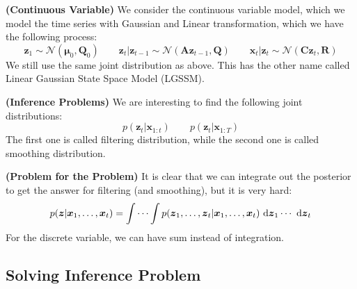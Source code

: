\begin{definition}{\textbf{(Continuous Variable)}}
    We consider the continuous variable model, which we model the time series with Gaussian and Linear transformation, which we have the following process:
    \begin{equation*}
        \boldsymbol z_1 \sim \mathcal{N}(\boldsymbol \mu_0, \boldsymbol Q_0) \qquad \boldsymbol z_t | \boldsymbol z_{t-1} \sim \mathcal{N}(\boldsymbol A\boldsymbol z_{t-1}, \boldsymbol Q) \qquad \boldsymbol x_t | \boldsymbol z_t \sim \mathcal{N}(\boldsymbol C\boldsymbol z_t, \boldsymbol R)
    \end{equation*}
    We still use the same joint distribution as above. This has the other name called Linear Gaussian State Space Model (LGSSM). 
\end{definition}

\begin{definition}{\textbf{(Inference Problems)}}
    We are interesting to find the following joint distributions:
    \begin{equation*}
        p(\boldsymbol z_t | \boldsymbol x_{1:t})  \qquad p(\boldsymbol z_t | \boldsymbol x_{1:T})
    \end{equation*}
    The first one is called filtering distribution, while the second one is called smoothing distribution. 
\end{definition}

\begin{remark}{\textbf{(Problem for the Problem)}}
    It is clear that we can integrate out the posterior to get the answer for filtering (and smoothing), but it is very hard:
    \begin{equation*}
        p(\boldsymbol z | \boldsymbol x_1,\dots,\boldsymbol x_t) = \int \cdots \int p(\boldsymbol z_1,\dots,\boldsymbol z_t|\boldsymbol x_1,\dots,\boldsymbol x_t) \ \mathrm{d} \boldsymbol z_1\cdots\ \mathrm{d} \boldsymbol z_t
    \end{equation*}
    For the discrete variable, we can have sum instead of integration.
\end{remark}

\subsection{Solving Inference Problem}

